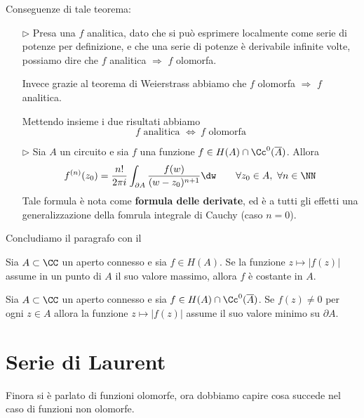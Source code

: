 Conseguenze di tale teorema:
\begin{enumerate}
    \item [$\triangleright$] Presa una $f$ analitica, dato che si può esprimere localmente come serie di potenze per definizione, e che una serie di potenze è derivabile infinite volte, possiamo dire che $f$ analitica $\Rightarrow$ $f$ olomorfa.

    Invece grazie al teorema di Weierstrass abbiamo che $f$ olomorfa $\Rightarrow$ $f$ analitica.

    Mettendo insieme i due risultati abbiamo
    $$
    \boxed{f\text{ analitica }\Leftrightarrow\ f\text{ olomorfa}}
    $$

    \item [$\triangleright$] Sia $A$ un circuito e sia $f$ una funzione $f\in H(A)\cap\Cc^0(\overline{A})$. Allora
    \begin{equation*}
    f^{(n)}(z_{0}) = \frac{n!}{2\pi i}\int_{\partial A}\frac{f(w)}{(w - z_{0})^{n + 1}} \dw \qquad \forall z_0\in A,\ \forall n\in \NN
    \end{equation*}
    Tale formula è nota come \textbf{formula delle derivate}, ed è a tutti gli effetti una generalizzazione della fomrula integrale di Cauchy (caso $n=0$).
\end{enumerate}

Concludiamo il paragrafo con il
\begin{thm}
Sia $A\subset\CC$ un aperto connesso e sia $f\in H(A)$. Se la funzione $z\mapsto |f(z)|$ assume in un punto di $A$ il suo valore massimo, allora $f$ è costante in $A$.
\end{thm}

\begin{coro}
Sia $A\subset\CC$ un aperto connesso e sia $f\in H(A)\cap\Cc^0(\overline{A})$. Se $f(z)\neq 0$ per ogni $z\in A$ allora la funzione $z\mapsto |f(z)|$ assume il suo valore minimo su $\partial A$.
\end{coro}

\section{Serie di Laurent}

Finora si è parlato di funzioni olomorfe, ora dobbiamo capire cosa succede nel caso di funzioni non olomorfe.

